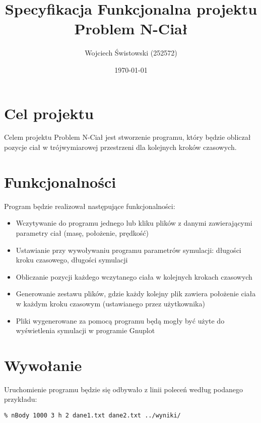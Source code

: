 \documentclass[a4paper,11pt,notitlepage]{article}
\author{Wojciech Świstowski (252572)}
\title{Specyfikacja Funkcjonalna projektu Problem N-Ciał}
\date{\today}
\begin{document}
\maketitle

\section{Cel projektu}

Celem projektu Problem N-Ciał jest stworzenie programu, który będzie obliczał pozycje ciał w trójwymiarowej przestrzeni dla kolejnych kroków czasowych.

\section{Funkcjonalności}
Program będzie realizował następujące funkcjonalności:
\begin{itemize}[noitemsep]
	\item Wczytywanie do programu jednego lub kliku plików z danymi zawierającymi parametry ciał (masę, położenie, prędkość)
	\item Ustawianie przy wywoływaniu programu parametrów symulacji: długości kroku czasowego, długości symulacji
	\item Obliczanie pozycji każdego wczytanego ciała w kolejnych krokach czasowych
	\item Generowanie zestawu plików, gdzie każdy kolejny plik zawiera położenie ciała w każdym kroku czasowym (ustawianego przez użytkownika)
	\item Pliki wygenerowane za pomocą programu będą mogły być użyte do wyświetlenia symulacji w programie Gnuplot
\end{itemize}

\section{Wywołanie}
Uruchomienie programu będzie się odbywało z linii poleceń według podanego przykładu:

\footnotesize\begin{verbatim}
% nBody 1000 3 h 2 dane1.txt dane2.txt ../wyniki/
\end{verbatim}\normalsize
\end{document}
